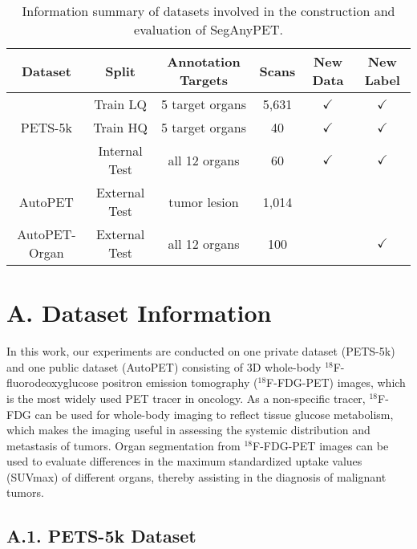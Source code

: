 \clearpage
\setcounter{page}{1}
\maketitlesupplementary

\begin{table*}[t]
	\centering
    \normalsize
    \setlength\tabcolsep{7pt}
	\renewcommand\arraystretch{1.3}
	\begin{tabular}{c|ccc|cc}
		\hline
Dataset & Split   & Annotation Targets & Scans & New Data & New Label \\ \hline
 & Train LQ &  5 target organs & 5,631 & $\checkmark$ & $\checkmark$ \\ 
PETS-5k & Train HQ &  5 target organs & 40 & $\checkmark$ & $\checkmark$\\ 
 & Internal Test & all 12 organs & 60 & $\checkmark$ & $\checkmark$\\ \hline
AutoPET & External Test & tumor lesion & 1,014 \\ \hline
AutoPET-Organ & External Test & all 12 organs & 100 &&$\checkmark$ \\ \hline 
\end{tabular}
 \caption{Information summary of datasets involved in the construction and evaluation of SegAnyPET.} \label{Table_Dataset}
\end{table*}




\section*{A. Dataset Information}
\label{app_data}

In this work, our experiments are conducted on one private dataset (PETS-5k) and one public dataset (AutoPET) consisting of 3D whole-body $^{18}$F-fluorodeoxyglucose positron emission tomography ($^{18}$F-FDG-PET) images, which is the most widely used PET tracer in oncology.
As a non-specific tracer, $^{18}$F-FDG can be used for whole-body imaging to reflect tissue glucose metabolism, which makes the imaging useful in assessing the systemic distribution and metastasis of tumors.
Organ segmentation from $^{18}$F-FDG-PET images can be used to evaluate differences in the maximum standardized uptake values (SUVmax) of different organs, thereby assisting in the diagnosis of malignant tumors.





\subsection*{A.1. PETS-5k Dataset}

